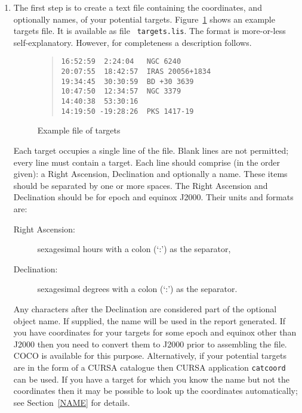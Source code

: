 \documentclass[twoside,11pt]{article}
\newcommand{\xref}[3]{#1}
\renewcommand{\_}{\texttt{\symbol{95}}}
\begin{document}
\begin{enumerate}

  \item The first step is to create a text file containing the coordinates,
   and optionally names, of your potential targets.  Figure~\ref{TARGETS}
   shows an example targets file.  It is available as file {\tt
   targets.lis}.  The format is more-or-less self-explanatory.  However,
   for completeness a description follows.

\begin{figure}[htbp]

\begin{quote}
\begin{verbatim}
16:52:59  2:24:04   NGC 6240
20:07:55  18:42:57  IRAS 20056+1834
19:34:45  30:30:59  BD +30 3639
10:47:50  12:34:57  NGC 3379
14:40:38  53:30:16
14:19:50 -19:28:26  PKS 1417-19
\end{verbatim}
\end{quote}

\caption{Example file of targets \label{TARGETS} }

\end{figure}

   Each target occupies a single line of the file.  Blank lines are not
   permitted; every line must contain a target.  Each line should
   comprise (in the order given): a Right Ascension, Declination and
   optionally a name.  These items should be separated by one or more
   spaces.  The Right Ascension and Declination should be for epoch and
   equinox J2000.  Their units and formats are:

  \begin{description}

    \item[{\rm Right Ascension:}] sexagesimal hours with a colon (`:')
     as the separator,

    \item[{\rm Declination:}] sexagesimal degrees with a colon (`:')
     as the separator.

  \end{description}

   Any characters after the Declination are considered part of the optional
   object name.  If supplied, the name will be used in the report
   generated.  If you have coordinates for your targets for some epoch
   and equinox other than J2000 then you need to convert them to J2000
   prior to assembling the file.  \xref{COCO}{sun56}{}\cite{SUN56} is
   available for this purpose.  Alternatively, if your potential targets are
   in the form of a \xref{CURSA}{sun190}{}\cite{SUN190} catalogue then CURSA
   application {\tt catcoord} can be used.  If you have a target for which
   you know the name but not the coordinates then it may be possible to look
   up the coordinates automatically; see Section~\ref{NAME} for details.


\end{enumerate}
\end{document}
